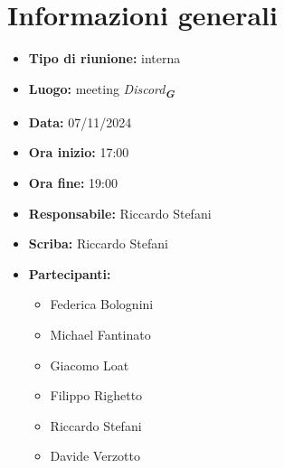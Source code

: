 


\section{Informazioni generali}

\begin{itemize}
    \item \textbf{Tipo di riunione:} interna
    \item \textbf{Luogo:} meeting \emph{Discord}\textsubscript{\textit{\textbf{G}}}
    \item \textbf{Data:} 07/11/2024
    \item \textbf{Ora inizio:} 17:00
    \item \textbf{Ora fine:} 19:00
    \item \textbf{Responsabile:} Riccardo Stefani
    \item \textbf{Scriba:} Riccardo Stefani
    \item \textbf{Partecipanti:}
    \begin{itemize}
        \item Federica Bolognini
        \item Michael Fantinato
        \item Giacomo Loat
        \item Filippo Righetto
        \item Riccardo Stefani
        \item Davide Verzotto
    \end{itemize}
\end{itemize}
